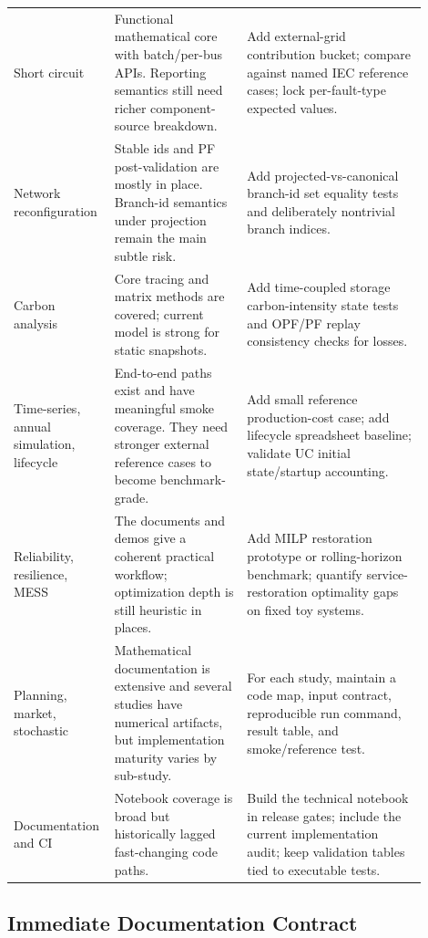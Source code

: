 \begin{longtable}{@{}L{0.17\linewidth}L{0.31\linewidth}L{0.42\linewidth}@{}}
Short circuit & Functional mathematical core with batch/per-bus APIs.  Reporting semantics still need richer component-source breakdown. & Add external-grid contribution bucket; compare against named IEC reference cases; lock per-fault-type expected values. \\
Network reconfiguration & Stable ids and PF post-validation are mostly in place.  Branch-id semantics under projection remain the main subtle risk. & Add projected-vs-canonical branch-id set equality tests and deliberately nontrivial branch indices. \\
Carbon analysis & Core tracing and matrix methods are covered; current model is strong for static snapshots. & Add time-coupled storage carbon-intensity state tests and OPF/PF replay consistency checks for losses. \\
Time-series, annual simulation, lifecycle & End-to-end paths exist and have meaningful smoke coverage.  They need stronger external reference cases to become benchmark-grade. & Add small reference production-cost case; add lifecycle spreadsheet baseline; validate UC initial state/startup accounting. \\
Reliability, resilience, MESS & The documents and demos give a coherent practical workflow; optimization depth is still heuristic in places. & Add MILP restoration prototype or rolling-horizon benchmark; quantify service-restoration optimality gaps on fixed toy systems. \\
Planning, market, stochastic & Mathematical documentation is extensive and several studies have numerical artifacts, but implementation maturity varies by sub-study. & For each study, maintain a code map, input contract, reproducible run command, result table, and smoke/reference test. \\
Documentation and CI & Notebook coverage is broad but historically lagged fast-changing code paths. & Build the technical notebook in release gates; include the current implementation audit; keep validation tables tied to executable tests. \\
\bottomrule
\end{longtable}

\subsection{Immediate Documentation Contract}

